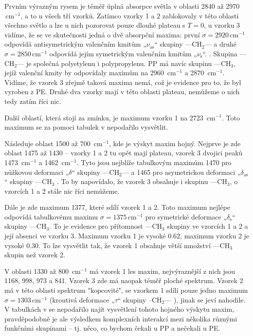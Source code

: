 \documentclass[10pt,a4paper]{article}
\renewcommand{\U}[1]{\ensuremath{\,\mathrm{#1}}}
\newcommand{\°}{\degree}
\begin{document}
Prvním výrazným rysem je téměř úplná absorpce světla v oblasti 2840 až 2970 \U{cm^{-1}}, a to u všech tří vzorků. Zatímco vzorky 1 a 2 zablokovaly v této oblasti všechno světlo a lze u nich pozorovat pouze dlouhé plateau s $T=0$, u vzorku 3 vidíme, že se ve skutečnosti jedná o dvě absorpční maxima: první $\sigma = 2920 \U{cm^{-1}}$ odpovídá antisymetrickým valenčním kmitům „$\nu_\mathrm{as}$“ skupiny —CH$_2$— a druhé $\sigma = 2850 \U{cm^{-1}}$ odpovídá jejím symetrickým valenčním kmitům „$\nu_\mathrm{s}$“. \cite{studijni-text}. Skupina —CH$_2$— je společná polyetylenu i polypropylenu. PP má navíc skupinu —CH$_3$, jejíž valenční kmity by odpovídaly maximům na 2960 \U{cm^{-1}} a 2870 \U{cm^{-1}}. Vidíme, že vzorek 3 zřejmě taková maxima nemá, což je evidence pro to, že byl vyroben z PE. Druhé dva vzorky mají v této oblasti plateau, nemůžeme o nich tedy zatím říci nic.

Další oblastí, která stojí za zmínku, je maximum vzorku 1 na 2723 \U{cm^{-1}}. Toto maximum se za pomoci tabulek v \cite{studijni-text} nepodařilo vysvětlit.

Následuje oblast 1500 až 700 \U{cm^{-1}}, kde je výskyt maxim hojný. Nejprve je zde oblast 1475 až 1430 – vzorky 1 a 2 tu opět mají plateau, vzorek 3 dvojici peaků 1473 \U{cm^{-1}} a 1462 \U{cm^{-1}}. Tyto jsou nejblíže tabulkovým maximům 1470 pro nůžkovou deformaci „$\delta$“ skupiny —CH$_2$— a 1465 pro asymetrickou deformaci „$\delta_\mathrm{as}$“ skupiny —CH$_3$ \cite{studijni-text}. To by napovídalo, že vzorek 3 obsahuje i skupinu —CH$_3$, o vzorcích 1 a 2 stále nic říci nemůžeme.

Dále je zde maximum 1377, které sdílí vzorek 1 a 2. Toto maximum nejlépe odpovídá tabulkovému maximu $\sigma = 1375 \U{cm^{-1}}$ pro symetrické deformace „$\delta_\mathrm{s}$“ skupiny —CH$_3$. To je evidence pro přítomnost —CH$_3$ skupiny ve vzorcích 1 a 2 a její absenci ve vzorku 3. Maximum vzorku 1 je vysoké 0.62, maximum vzorku 2 je vysoké 0.30. To lze vysvětlit tak, že vzorek 1 obsahuje větší množství —CH$_3$ skupin než vzorek 2.

V oblasti 1330 až 800 \U{cm^{-1}} má vzorek 1 les maxim, nejvýraznější z nich jsou 1168, 998, 973 a 841. Vzorek 3 zde má naopak téměř ploché spektrum. Vzorek 2 má v této oblasti spektrum "kopcovité", se vzorkem 1 sdílí pouze jedno maximum $\sigma = 1303 \U{cm^{-1}}$ (kroutivá deformace „$\tau$“ skupiny –CH$_2$— \cite{studijni-text}), jinak se jeví nahodile. V tabulkách v \cite{studijni-text} se nepodařilo najít vysvětlení tohoto hojného výskytu maxim, pravděpodobně je ale výsledkem komplexních interakcí mezi několika různými funkčními skupinami – tj. něco, co bychom čekali u PP a nečekali u PE.
\end{document}
